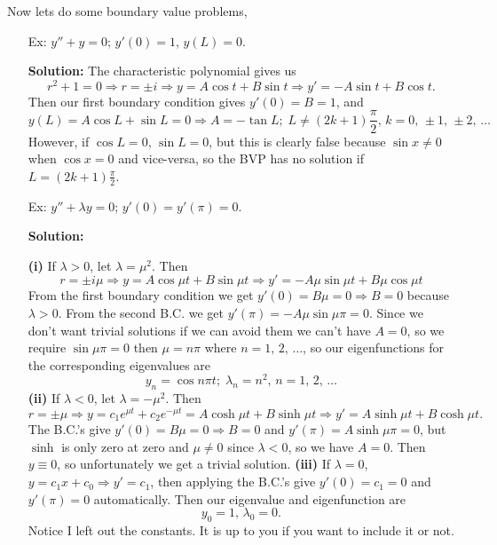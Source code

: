 \documentclass[reqno]{amsart}
\theoremstyle{definition}
\begin{document}
\bigskip
\bigskip
\bigskip
\bigskip


Now lets do some boundary value problems,
%
\begin{enumerate}
\setlength\itemsep{2em}

\item[Ex:  ]  $y'' + y = 0$; $y'(0) = 1$, $y(L) = 0$.

\textbf{Solution:  }  The characteristic polynomial gives us
%
\begin{equation*}
r^2 + 1 = 0 \Rightarrow r = \pm i \Rightarrow y = A\cos t + B\sin t \Rightarrow y' = -A\sin t + B\cos t.
\end{equation*}
%
Then our first boundary condition gives $y'(0) = B = 1$, and
%
\begin{equation*}
y(L) = A\cos L + \sin L = 0 \Rightarrow A = - \tan L;\; L \neq (2k+1)\frac{\pi}{2},\, k = 0,\,\pm 1,\,\pm 2,\, \ldots
\end{equation*}
%
However, if $\cos L = 0$, $\sin L = 0$, but this is clearly false because $\sin x \neq 0$ when $\cos x = 0$
and vice-versa, so the BVP has no solution if $L = (2k+1)\frac{\pi}{2}$.

\item[Ex:  ]  $y'' + \lambda y = 0$; $y'(0) = y'(\pi) = 0$.

\textbf{Solution:  }

\textbf{(i)} If $\lambda > 0$, let $\lambda = \mu^2$.  Then
%
\begin{equation*}
r = \pm i\mu \Rightarrow y = A\cos\mu t + B\sin\mu t \Rightarrow y' = -A\mu\sin\mu t + B\mu\cos\mu t
\end{equation*}
%
From the first boundary condition we get $y'(0) = B\mu = 0 \Rightarrow B = 0$ because $\lambda > 0$.
From the second B.C. we get $y'(\pi) = -A\mu\sin\mu\pi = 0$.  Since we don't want trivial solutions if we
can avoid them we can't have $A = 0$, so we require $\sin\mu\pi = 0$ then $\mu = n\pi$ where
$n = 1,\, 2,\, \ldots$, so our eigenfunctions for the corresponding eigenvalues are
%
\begin{equation*}
y_n = \cos n\pi t;\; \lambda_n = n^2,\, n = 1,\, 2,\, \ldots
\end{equation*}
%
\textbf{(ii)}  If $\lambda < 0$, let $\lambda = - \mu^2$.  Then
%
\begin{equation*}
r = \pm \mu \Rightarrow y = c_1e^{\mu t} + c_2e^{-\mu t} = A\cosh\mu t + B\sinh\mu t
\Rightarrow y' = A\sinh\mu t + B\cosh\mu t.
\end{equation*}
%
The B.C.'s give $y'(0) = B\mu = 0 \Rightarrow B = 0$ and $y'(\pi) = A\sinh\mu\pi = 0$, but
$\sinh$ is only zero at zero and $\mu \neq 0$ since $\lambda < 0$, so we have $A = 0$.
Then $y \equiv 0$, so unfortunately we get a trivial solution.
%
\textbf{(iii)}  If $\lambda = 0$, $y = c_1x + c_0 \Rightarrow y' = c_1$, then applying the B.C.'s
give $y'(0) = c_1 = 0$ and $y'(\pi) = 0$ automatically.  Then our eigenvalue and eigenfunction
are
%
\begin{equation*}
y_0 = 1,\, \lambda_0 = 0.
\end{equation*}
%
Notice I left out the constants.  It is up to you if you want to include it or not.


\end{enumerate}
\end{document}
